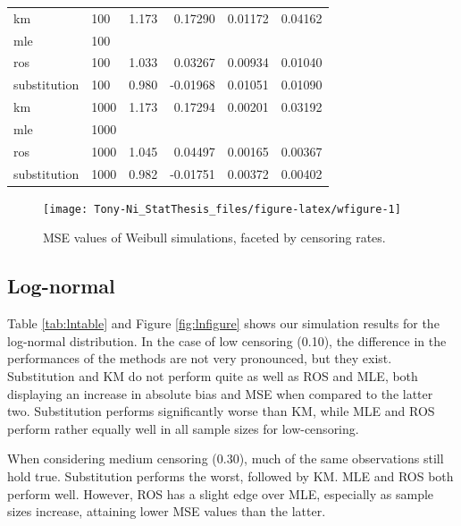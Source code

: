 \documentclass[12pt, twoside]{amherstthesis}
\begin{document}
\begin{table}
\begin{tabular}[t]{llrrrr}
\hline
\hspace{1em}km & 100 & 1.173 & 0.17290 & 0.01172 & 0.04162\\
\hspace{1em}mle & 100 &  &  &  & \\
\hspace{1em}ros & 100 & 1.033 & 0.03267 & 0.00934 & 0.01040\\
\hspace{1em}substitution & 100 & 0.980 & -0.01968 & 0.01051 & 0.01090\\
\hline
\hspace{1em}km & 1000 & 1.173 & 0.17294 & 0.00201 & 0.03192\\
\hspace{1em}mle & 1000 &  &  &  & \\
\hspace{1em}ros & 1000 & 1.045 & 0.04497 & 0.00165 & 0.00367\\
\hspace{1em}substitution & 1000 & 0.982 & -0.01751 & 0.00372 & 0.00402\\
\bottomrule
\end{tabular}
\end{table}
\begin{figure}

{\centering \texttt{[image: Tony-Ni\_StatThesis\_files/figure-latex/wfigure-1]} 

}

\caption{MSE values of Weibull simulations, faceted by censoring rates.}\label{fig:wfigure}
\end{figure}
\hypertarget{log-normalsimstudy}{%
\subsection{Log-normal}\label{log-normalsimstudy}}

Table \ref{tab:lntable} and Figure \ref{fig:lnfigure} shows our simulation results for the log-normal distribution. In the case of low censoring (0.10), the difference in the performances of the methods are not very pronounced, but they exist. Substitution and KM do not perform quite as well as ROS and MLE, both displaying an increase in absolute bias and MSE when compared to the latter two. Substitution performs significantly worse than KM, while MLE and ROS perform rather equally well in all sample sizes for low-censoring.

When considering medium censoring (0.30), much of the same observations still hold true. Substitution performs the worst, followed by KM. MLE and ROS both perform well. However, ROS has a slight edge over MLE, especially as sample sizes increase, attaining lower MSE values than the latter.
\end{document}
